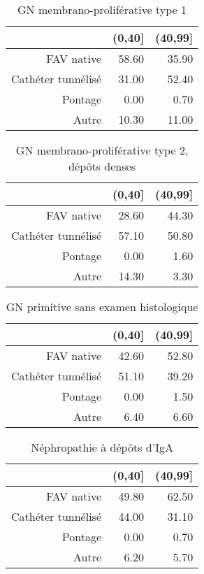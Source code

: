 \documentclass[11pt,a4paper]{article}\usepackage[]{graphicx}\usepackage[]{color}
\begin{document}
\begin{table}[H]
\centering
\begin{tabular}{rrr}
  \hline
 & (0,40] & (40,99] \\ 
  \hline
FAV native & 58.60 & 35.90 \\ 
  Cathéter tunnélisé & 31.00 & 52.40 \\ 
  Pontage & 0.00 & 0.70 \\ 
  Autre & 10.30 & 11.00 \\ 
   \hline
\end{tabular}
\caption{GN membrano-proliférative type 1} 
\end{table}
\begin{table}[H]
\centering
\begin{tabular}{rrr}
  \hline
 & (0,40] & (40,99] \\ 
  \hline
FAV native & 28.60 & 44.30 \\ 
  Cathéter tunnélisé & 57.10 & 50.80 \\ 
  Pontage & 0.00 & 1.60 \\ 
  Autre & 14.30 & 3.30 \\ 
   \hline
\end{tabular}
\caption{GN membrano-proliférative type 2, dépôts denses} 
\end{table}
\begin{table}[H]
\centering
\begin{tabular}{rrr}
  \hline
 & (0,40] & (40,99] \\ 
  \hline
FAV native & 42.60 & 52.80 \\ 
  Cathéter tunnélisé & 51.10 & 39.20 \\ 
  Pontage & 0.00 & 1.50 \\ 
  Autre & 6.40 & 6.60 \\ 
   \hline
\end{tabular}
\caption{GN primitive sans examen histologique} 
\end{table}
\begin{table}[H]
\centering
\begin{tabular}{rrr}
  \hline
 & (0,40] & (40,99] \\ 
  \hline
FAV native & 49.80 & 62.50 \\ 
  Cathéter tunnélisé & 44.00 & 31.10 \\ 
  Pontage & 0.00 & 0.70 \\ 
  Autre & 6.20 & 5.70 \\ 
   \hline
\end{tabular}
\caption{Néphropathie à dépôts d'IgA} 
\end{table}
\end{document}
